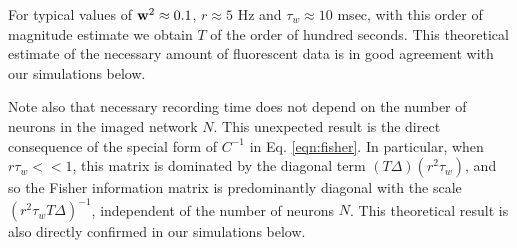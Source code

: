 For typical values of $\mathbf{w}^2\approx 0.1$, $r\approx 5$  Hz and $ \tau_w \approx 10$ msec, 
with this order of magnitude estimate we obtain $T$ of the order of hundred seconds. This theoretical estimate of the necessary amount of fluorescent data is in good agreement with our simulations below.

Note also that necessary recording time does not depend on the number of neurons in the imaged network $N$. This unexpected result is the direct consequence of the special form of $C^{-1}$ in Eq. \eqref{eqn:fisher}. In particular, when $r \tau_w <<1$, this matrix is dominated by the diagonal term $(T\Delta)(r^2  \tau_w)$, and so the Fisher information matrix is predominantly diagonal with the scale $(r^2 \tau_w T\Delta)^{-1}$, independent of the number of neurons $N$. This theoretical result is also directly confirmed in our simulations below.